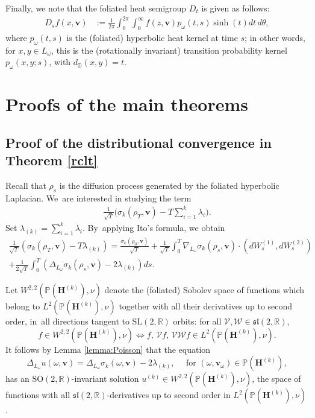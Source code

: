 \documentclass[JEP,XML,SOM,Unicode,published]{cedram}
\theoremstyle{plain}
\theoremstyle{definition}
\numberwithin{equation}{subsection}
\newcommand\bD{\mathbb{D}}
\newcommand\bP{\mathbb{P}}
\newcommand\bR{\mathbb{R}}\let\R\bR
\newcommand\cV{\mathcal{V}}
\newcommand\cW{\mathcal{W}}
\newcommand{\SL}{\mathrm{SL}}
\newcommand{\SO}{\mathrm{SO}}
\let\gradient\nabla
\let\laplacian\Delta
\newcommand{\bfH}{\boldsymbol{H}}
\newcommand{\bfv}{\boldsymbol{v}}
\newcommand{\defeq}{:=}
\begin{document}
Finally, we note that the foliated heat semigroup $D_t$ is given as follows:\vspace*{-3pt}
\begin{align*}
D_s f(x,\bfv)&\defeq \frac{1}{2\pi}\int_0^{2\pi} \int_0^\infty f(z,\bfv) p_{\omega}(t,s) \sinh(t) d t\, d\theta,
\end{align*}
where $p_{\omega}(t,s)$ is the (foliated) hyperbolic heat kernel at time $s$; in other words, for $x,y \in L_\omega$, this is the (rotationally invariant) transition probability kernel $p_{\omega} (x,y;s)$, with $d_{\bD}(x,y) = t$.

\section{Proofs of the main theorems}
\subsection{Proof of the distributional convergence in Theorem \ref{rclt}}\label{randomproof} Recall that $\rho_s$ is the diffusion process generated by the foliated hyperbolic Laplacian. We~are interested in studying the term\vspace*{-5pt}
\begin{align*}\frac{1}{\sqrt{T}} \bigl(\sigma_k(\rho_T,\bfv) - T\textstyle\sum_{i=1}^k\lambda_i\bigr).
\end{align*}
Set $\lambda_{(k)} = \sum_{i=1}^k \lambda_i$. By~applying Ito's formula, we obtain\vspace*{-5pt}
\begin{multline*}
\frac{1}{\sqrt{T}} (\sigma_k(\rho_T,\bfv) - T\lambda_{(k)}) = \frac{\sigma_k(\rho_0,\bfv)}{\sqrt{T}} +\frac{1}{\sqrt{T}}\int_0^T \gradient_{L_\omega}\sigma_k(\rho_s,\bfv) \cdot (dW^{(1)}_s,dW^{(2)}_s) \\[-5pt]
+ \frac{1}{2\sqrt{T}}\int_0^T (\laplacian_{L_\omega} \sigma_k(\rho_s,\bfv)-2\lambda_{(k)})ds.
\end{multline*}

Let $W^{2,2}(\bP(\bfH^{(k)}), \nu)$ denote the (foliated) Sobolev space of functions which belong to $L^2(\bP(\bfH^{(k)}), \nu)$ together with all their derivatives up to second order, in~all \hbox{directions} tangent to $\SL(2, \R)$ orbits: for all $\cV, \cW \in \mathfrak{sl}(2, \R)$,
\[
f \in W^{2,2}(\bP(\bfH^{(k)}), \nu) \iff f, \,\cV f, \, \cV \cW f \in L^2(\bP(\bfH^{(k)}), \nu).
\]
It follows by Lemma \ref{lemma:Poisson} that the equation\vspace*{-3pt}
\begin{equation}
\label{poissoneq}
\laplacian_{L_\omega} u(\omega,\bfv) = \laplacian_{L_\omega} \sigma_k(\omega,\bfv) - 2\lambda_{(k)}, \quad \text{ for } (\omega,\bfv_\omega)\in \bP(\bfH^{(k)}),
\end{equation}
has an $\SO(2,\bR)$-invariant solution $u^{(k)} \!\in\! W^{2,2}(\bP(\bfH^{(k)}), \nu)$, the space of functions with all $\mathfrak{sl}(2, \R)$-derivatives up to second order in $L^2(\bP(\bfH^{(k)}),\nu)$.
\end{document}
